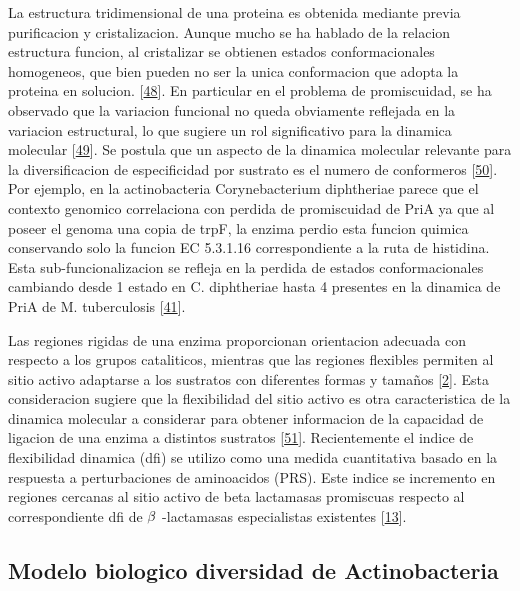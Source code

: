 \documentclass[12pt,twoside]{reedthesis}
\begin{document}
  La estructura tridimensional de una proteina es obtenida mediante previa
  purificacion y cristalizacion. Aunque mucho se ha hablado de la relacion
  estructura funcion, al cristalizar se obtienen estados conformacionales
  homogeneos, que bien pueden no ser la unica conformacion que adopta la
  proteina en solucion.
  {[}\protect\hyperlink{ref-james_conformational_2003}{48}{]}. En
  particular en el problema de promiscuidad, se ha observado que la
  variacion funcional no queda obviamente reflejada en la variacion
  estructural, lo que sugiere un rol significativo para la dinamica
  molecular {[}\protect\hyperlink{ref-parisi_conformational_2015}{49}{]}.
  Se postula que un aspecto de la dinamica molecular relevante para la
  diversificacion de especificidad por sustrato es el numero de
  conformeros {[}\protect\hyperlink{ref-javier_zea_protein_2013}{50}{]}.
  Por ejemplo, en la actinobacteria Corynebacterium diphtheriae parece que
  el contexto genomico correlaciona con perdida de promiscuidad de PriA ya
  que al poseer el genoma una copia de trpF, la enzima perdio esta funcion
  quimica conservando solo la funcion EC 5.3.1.16 correspondiente a la
  ruta de histidina. Esta sub-funcionalizacion se refleja en la perdida de
  estados conformacionales cambiando desde 1 estado en C. diphtheriae
  hasta 4 presentes en la dinamica de PriA de M. tuberculosis
  {[}\protect\hyperlink{ref-noda-garcia_evolution_2013}{41}{]}.
  
  Las regiones rigidas de una enzima proporcionan orientacion adecuada con
  respecto a los grupos cataliticos, mientras que las regiones flexibles
  permiten al sitio activo adaptarse a los sustratos con diferentes formas
  y tamaños {[}\protect\hyperlink{ref-copley_enzymes_2003}{2}{]}. Esta
  consideracion sugiere que la flexibilidad del sitio activo es otra
  caracteristica de la dinamica molecular a considerar para obtener
  informacion de la capacidad de ligacion de una enzima a distintos
  sustratos
  {[}\protect\hyperlink{ref-gatti-lafranconi_flexibility_2013}{51}{]}.
  Recientemente el indice de flexibilidad dinamica (dfi) se utilizo como
  una medida cuantitativa basado en la respuesta a perturbaciones de
  aminoacidos (PRS). Este indice se incremento en regiones cercanas al
  sitio activo de beta lactamasas promiscuas respecto al correspondiente
  dfi de \(\noindent\beta\) -lactamasas especialistas existentes
  {[}\protect\hyperlink{ref-zou_evolution_2015}{13}{]}.
  
  \subsection{Modelo biologico diversidad de
  Actinobacteria}\label{modelo-biologico-diversidad-de-actinobacteria}
  
\end{document}
